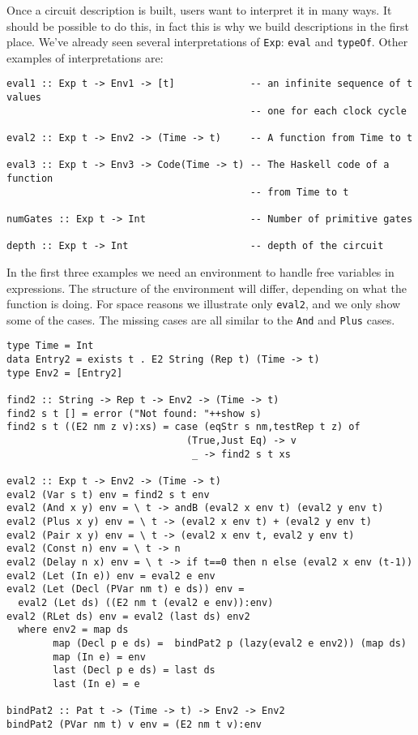 \documentclass[10pt,twoside]{article}
\begin{document}
Once a circuit description is built, users want to interpret it
in many ways. It should be possible to do this, in fact this is
why we build descriptions in the first place. We've already
seen several interpretations of {\tt Exp}: {\tt eval} and {\tt typeOf}.
Other examples of
interpretations are:
\begin{verbatim}
eval1 :: Exp t -> Env1 -> [t]             -- an infinite sequence of t values
                                          -- one for each clock cycle
                                        
eval2 :: Exp t -> Env2 -> (Time -> t)     -- A function from Time to t

eval3 :: Exp t -> Env3 -> Code(Time -> t) -- The Haskell code of a function 
                                          -- from Time to t

numGates :: Exp t -> Int                  -- Number of primitive gates

depth :: Exp t -> Int                     -- depth of the circuit
\end{verbatim}
In the first three examples we need an environment to handle
free variables in expressions. The structure of the environment
will differ, depending on what the function is doing. For space
reasons we illustrate only {\tt eval2}, and we only show some
of the cases. The missing cases are all similar to the {\tt And}
and {\tt Plus} cases.
\begin{verbatim}
type Time = Int
data Entry2 = exists t . E2 String (Rep t) (Time -> t)
type Env2 = [Entry2]

find2 :: String -> Rep t -> Env2 -> (Time -> t)
find2 s t [] = error ("Not found: "++show s)
find2 s t ((E2 nm z v):xs) = case (eqStr s nm,testRep t z) of
                               (True,Just Eq) -> v
                                _ -> find2 s t xs

eval2 :: Exp t -> Env2 -> (Time -> t)
eval2 (Var s t) env = find2 s t env 
eval2 (And x y) env = \ t -> andB (eval2 x env t) (eval2 y env t)      
eval2 (Plus x y) env = \ t -> (eval2 x env t) + (eval2 y env t)
eval2 (Pair x y) env = \ t -> (eval2 x env t, eval2 y env t)
eval2 (Const n) env = \ t -> n
eval2 (Delay n x) env = \ t -> if t==0 then n else (eval2 x env (t-1))
eval2 (Let (In e)) env = eval2 e env
eval2 (Let (Decl (PVar nm t) e ds)) env = 
  eval2 (Let ds) ((E2 nm t (eval2 e env)):env)
eval2 (RLet ds) env = eval2 (last ds) env2
  where env2 = map ds
        map (Decl p e ds) =  bindPat2 p (lazy(eval2 e env2)) (map ds)
        map (In e) = env      
        last (Decl p e ds) = last ds
        last (In e) = e

bindPat2 :: Pat t -> (Time -> t) -> Env2 -> Env2
bindPat2 (PVar nm t) v env = (E2 nm t v):env
\end{verbatim}
\end{document}
